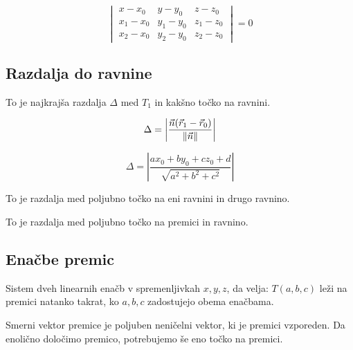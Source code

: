 
\[
	\begin{vmatrix}
		x-x_0 & y - y_0 & z - z_0 \\
		x_1-x_0 & y_1 - y_0 & z_1 - z_0 \\
		x_2-x_0 & y_2 - y_0 & z_2 - z_0
	\end{vmatrix} = 0
\]

\subsection{Razdalja do ravnine}


To je najkrajša razdalja $\Delta$ med $T_1$ in kakšno točko na ravnini.

\[
	\Delta = \left| \frac{\vec{n}(\vec{r}_1 - \vec{r}_0)}{\| \vec{n} \|} \right|
\]


\[
	\Delta = \left| \frac{ax_0 + by_0 + cz_0 + d}{\sqrt{a^2 + b^2 + c^2}} \right|
\]


To je razdalja med poljubno točko na eni ravnini in drugo ravnino.


To je razdalja med poljubno točko na premici in ravnino.

\subsection{Enačbe premic}


Sistem dveh linearnih enačb v spremenljivkah $x, y, z$, da velja: $T(a,b,c)$ leži na premici natanko takrat, ko $a, b, c$ zadostujejo obema enačbama.


Smerni vektor premice je poljuben neničelni vektor, ki je premici vzporeden. Da enolično določimo premico, potrebujemo še eno točko na premici.

